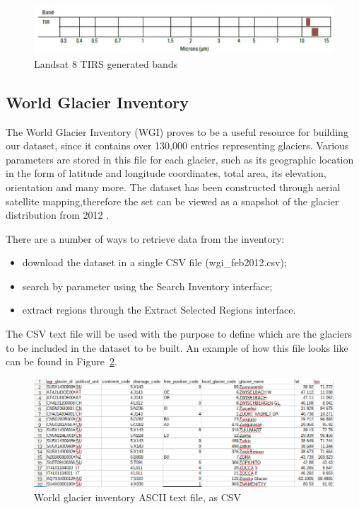 \documentclass[12pt, a4paper]{report}
\begin{document}
	\begin{figure}[h!]
		\centering
		\includegraphics[scale=0.5]{../images/Landsat8-TIRS-Bands.png}
		\caption{Landsat 8 TIRS generated bands \cite{l8otb}}
		\label{fig:L8TIRS}
	\end{figure}
	
	\subsection{World Glacier Inventory}
	\label{seq:wgi}
	
	\par The World Glacier Inventory (WGI) proves to be a useful resource for building our dataset, since it contains over 130,000 entries representing glaciers. Various parameters are stored in this file for each glacier, such as its geographic location in the form of latitude and longitude coordinates, total area, its elevation, orientation and many more. The dataset has been constructed through aerial satellite mapping,therefore the set can be viewed as a snapshot of the glacier distribution from 2012 \cite{WGI}.  
	
	\par There are a number of ways to retrieve data from the inventory:
	\begin{itemize}
		\item download the dataset in a single CSV file (wgi\_feb2012.csv);
		\item search by parameter using the Search Inventory interface;
		\item extract regions through the Extract Selected Regions interface.
	\end{itemize}

	\par The CSV text file will be used with the purpose to define which are the glaciers to be included in the dataset to be built. An example of how this file looks like can be found in Figure~\ref{fig:WGI_ASCII}.
	
	\begin{figure}[h]
		\centering
		\includegraphics[scale=0.5]{../images/wgi_ASCII_file.png}
		\caption{World glacier inventory ASCII text file, as CSV}
		\label{fig:WGI_ASCII}
	\end{figure}
	
\end{document}
